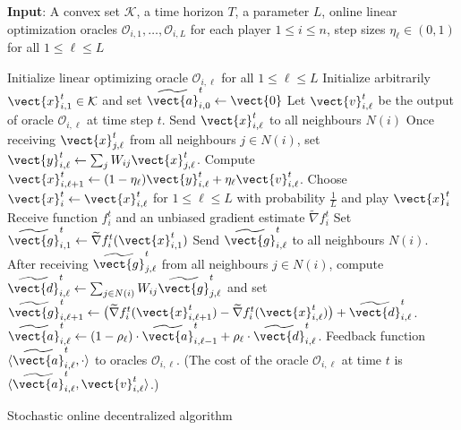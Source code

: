 \begin{algorithm}[ht]
\begin{flushleft}
\textbf{Input}:  A convex set $\mathcal{K}$, 
	a time horizon $T$, a parameter $L$, online linear optimization oracles $\mathcal{O}_{i,1}, \ldots, \mathcal{O}_{i,L}$ for each player $1 \leq i \leq n$, 
	step sizes $\eta_\ell \in (0, 1)$ for all $1 \leq \ell \leq L$
\end{flushleft}
\begin{algorithmic}[1]
\STATE Initialize linear optimizing oracle $\mathcal{O}_{i,\ell}$ for all $1 \leq \ell \leq L$
		\STATE Initialize arbitrarily $\vect{x}^t_{i,1} \in \mathcal{K}$ and set $\widetilde{\vect{{a}}}^t_{i,0} \gets \vect{0}$ 
			\STATE Let $\vect{v}^{t}_{i,\ell}$ be the output of oracle $\mathcal{O}_{i,\ell}$ at time step $t$.
			\STATE Send $\vect{x}^{t}_{i,\ell}$ to all neighbours $N(i)$
			\STATE \label{alg:y} 
				Once receiving $\vect{x}^{t}_{j,\ell}$ from all neighbours $j \in N(i)$, 
				set $\vect{y}^{t}_{i,\ell} \gets \sum_{j} W_{ij} \vect{x}^{t}_{j,\ell}$.
			\STATE \label{alg:x} Compute $\vect{x}^{t}_{i,\ell+1} \gets (1 - \eta_{\ell}) \vect{y}^{t}_{i,\ell} + \eta_{\ell} \vect{v}^{t}_{i,\ell}$.
		\ENDFOR
		\STATE Choose $\vect{x}^{t}_{i} \gets \vect{x}^{t}_{i,\ell}$ for $1 \leq \ell \leq L$ with probability $\frac{1}{L}$ and play $\vect{x}^t_{i}$
		\STATE Receive function $f^{t}_{i}$ and an unbiased gradient estimate $\widetilde {\nabla} f^{t}_{i}$
		\STATE Set $\widetilde{\vect{g}}^{t}_{i,1} \gets \widetilde{\nabla} f^{t}_{i}(\vect{x}^{t}_{i,1})$
				\STATE Send $\widetilde{\vect{g}}^{t}_{i,\ell}$ to all neighbours $N(i)$.
				\STATE After receiving $\widetilde{\vect{g}}^{t}_{j,\ell}$ from all neighbours $j \in N(i)$, compute
					$\widetilde{\vect{d}}^{t}_{i,\ell} \gets  \sum_{j \in N(i)} W_{ij} \widetilde{\vect{g}}^{t}_{j,\ell}$ and set $\widetilde{\vect{g}}^{t}_{i,\ell + 1} \gets \bigl( \widetilde{\nabla} f^{t}_{i}(\vect{x}^t_{i,\ell+1}) 
						-  \widetilde{\nabla} f^{t}_{i}(\vect{x}^{t}_{i,\ell}) \bigr) + \widetilde{\vect{d}}^{t}_{i,\ell}$.
				\STATE $ \widetilde{\vect{a}}^t_{i, \ell} \gets (1 - \rho_\ell) \cdot \widetilde{\vect{a}}^t_{i, \ell-1} + \rho_\ell \cdot \widetilde{\vect{d}}^{t}_{i,\ell}$.
				\STATE Feedback function $\langle \widetilde{\vect{a}}^{t}_{i,\ell}, \cdot \rangle$ 
				to oracles $\mathcal{O}_{i,\ell}$. (The cost of the oracle $\mathcal{O}_{i,\ell}$ at time $t$ is 
				$\langle \widetilde{\vect{a}}^{t}_{i,\ell}, \vect{v}^{t}_{i,\ell}  \rangle$.)
			\ENDFOR
	\ENDFOR
\ENDFOR
\end{algorithmic}
\caption{Stochastic online decentralized algorithm}
\label{algo:online-dist-FW-stoc}
\end{algorithm}